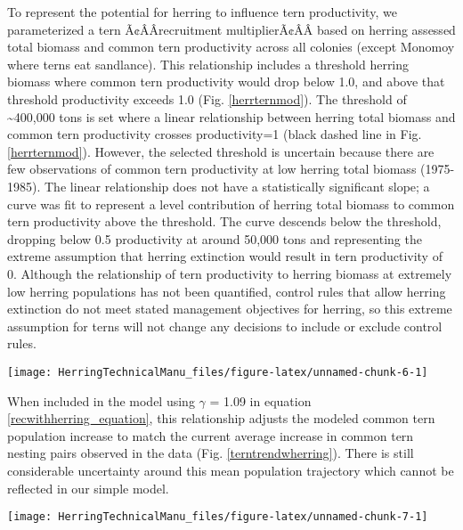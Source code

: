 \documentclass[]{article}
\let\origfigure\figure
\let\endorigfigure\endfigure
\renewenvironment{figure}[1][2] {
    \expandafter\origfigure\expandafter[H]
} {
    \endorigfigure
}
\begin{document}
To represent the potential for herring to influence tern productivity,
we parameterized a tern Ã¢ÂÂrecruitment multiplierÃ¢ÂÂ based on
herring assessed total biomass and common tern productivity across all
colonies (except Monomoy where terns eat sandlance). This relationship
includes a threshold herring biomass where common tern productivity
would drop below 1.0, and above that threshold productivity exceeds 1.0
(Fig. \ref{herrternmod}). The threshold of \textasciitilde{}400,000 tons
is set where a linear relationship between herring total biomass and
common tern productivity crosses productivity=1 (black dashed line in
Fig. \ref{herrternmod}). However, the selected threshold is uncertain
because there are few observations of common tern productivity at low
herring total biomass (1975-1985). The linear relationship does not have
a statistically significant slope; a curve was fit to represent a level
contribution of herring total biomass to common tern productivity above
the threshold. The curve descends below the threshold, dropping below
0.5 productivity at around 50,000 tons and representing the extreme
assumption that herring extinction would result in tern productivity of
0. Although the relationship of tern productivity to herring biomass at
extremely low herring populations has not been quantified, control rules
that allow herring extinction do not meet stated management objectives
for herring, so this extreme assumption for terns will not change any
decisions to include or exclude control rules.

\begin{figure}

{\centering \texttt{[image: HerringTechnicalManu\_files/figure-latex/unnamed-chunk-6-1]} 

}

\caption{Modeled influence of herring total biomass on tern reproductive success \label{herrternmod}}\label{fig:unnamed-chunk-6}
\end{figure}

When included in the model using \(\gamma\) = 1.09 in equation
\ref{recwithherring_equation}, this relationship adjusts the modeled
common tern population increase to match the current average increase in
common tern nesting pairs observed in the data (Fig.
\ref{terntrendwherring}). There is still considerable uncertainty around
this mean population trajectory which cannot be reflected in our simple
model.

\begin{figure}

{\centering \texttt{[image: HerringTechnicalManu\_files/figure-latex/unnamed-chunk-7-1]} 

}

\caption{Population trends for Gulf of Maine terns with simulated herring-common tern productivity relationship \label{terntrendwherring}}\label{fig:unnamed-chunk-7}
\end{figure}
\end{document}
